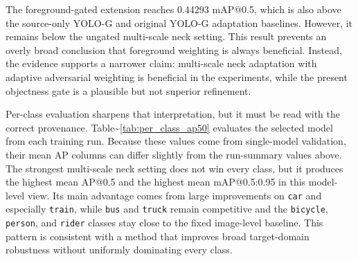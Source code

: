 \documentclass[
  11pt,
]{article}
\begin{document}
The foreground-gated extension reaches 0.44293 mAP@0.5, which is also
above the source-only YOLO-G and original YOLO-G adaptation baselines.
However, it remains below the ungated multi-scale neck setting. This
result prevents an overly broad conclusion that foreground weighting is
always beneficial. Instead, the evidence supports a narrower claim:
multi-scale neck adaptation with adaptive adversarial weighting is
beneficial in the experiments, while the present objectness gate is a
plausible but not superior refinement.

Per-class evaluation sharpens that interpretation, but it must be read
with the correct provenance.
Table\textasciitilde{}\ref{tab:per_class_ap50} evaluates the selected
model from each training run. Because these values come from
single-model validation, their mean AP columns can differ slightly from
the run-summary values above. The strongest multi-scale neck setting
does not win every class, but it produces the highest mean AP@0.5 and
the highest mean mAP@0.5:0.95 in this model-level view. Its main
advantage comes from large improvements on \texttt{car} and especially
\texttt{train}, while \texttt{bus} and \texttt{truck} remain competitive
and the \texttt{bicycle}, \texttt{person}, and \texttt{rider} classes
stay close to the fixed image-level baseline. This pattern is consistent
with a method that improves broad target-domain robustness without
uniformly dominating every class.

\begin{table}[!t]
\centering
\caption{Per-class AP@0.5 on Foggy Cityscapes. Best values are shown in bold.}
\label{tab:per_class_ap50}
\scriptsize
\setlength{\tabcolsep}{3.2pt}
\end{table}
\end{document}
